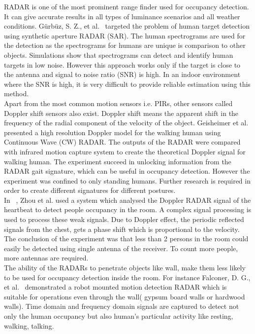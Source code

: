 
RADAR is one of the most prominent range finder used for occupancy detection. It can give accurate results in all types of luminance scenarios and all weather conditions.
G\"{u}rb\"{u}z, S. Z., et al.~\cite{gurbuz2007detection} targeted the problem of human target detection using synthetic aperture RADAR (SAR). The human spectrograms are used for the detection as the spectrograms for humans are unique is comparison to other objects. Simulations show that spectrograms can detect and identify human targets in low noise. However this approach works only if the target is close to the antenna and signal to noise ratio (SNR) is high. In an indoor environment where the SNR is high, it is very difficult to provide reliable estimation using this method.
\\

Apart from the most common motion sensors i.e. PIRs, other sensors called Doppler shift sensors also exist. Doppler shift means the apparent shift in the frequency of the radial component of the velocity of the object.
Geisheimer et al.~\cite{geisheimer2002high} presented a high resolution Doppler model for the walking human using Continuous Wave (CW) RADAR. The outputs of the RADAR were compared with infrared motion capture system to create the theoretical Doppler signal for walking human. The experiment succeed in unlocking information from the RADAR gait signature, which can be useful in occupancy detection. However the experiment was confined to only standing humans. Further research is required in order to create different signatures for different postures. 
\\

In ~\cite{zhou2006detection}, Zhou et al. used a system which analysed the Doppler RADAR signal of the heartbeat to detect people occupancy in the room. A complex signal processing is used to process these weak signals. Due to Doppler effect, the periodic reflected signals from the chest, gets a phase shift which is proportional to the velocity. The conclusion of the experiment was that less than 2 persons in the room could easily be detected using single antenna of the receiver. To count more people, more antennas are required. 
\\

The ability of the RADARs to penetrate objects like wall, make them less likely to be used for occupancy detection inside the room. For instance Falconer, D. G., et al.~\cite{falconer2000robot} demonstrated a robot mounted motion detection RADAR which is suitable for operations even through the wall( gypsum board walls or hardwood walls). Time domain and frequency domain signals are captured to detect not only the human occupancy but also human's particular activity like resting, walking, talking.

